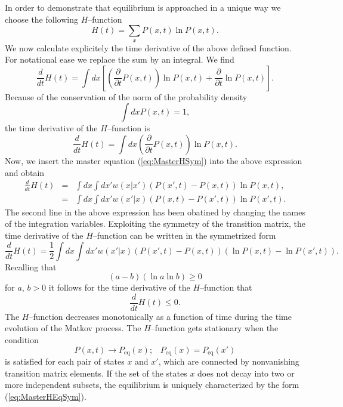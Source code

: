 In order to demonstrate that equilibrium is approached in a unique way we
choose the following $H$--function
\begin{displaymath}
  H(t) = \sum_x P(x,t) \ln P(x,t).
\end{displaymath}
We now calculate explicitely the time derivative of the above defined
function. For notational ease we replace the sum by an integral. We find
\begin{displaymath}
  \frac{d}{dt} H(t)  = \int dx 
\left[ \left( \frac{\partial}{\partial t} P(x,t) \right) \ln P(x,t) +
         \frac{\partial}{\partial t} \ln P(x,t) 
     \right].
\end{displaymath}
Because of the conservation of the norm of the probability density
\begin{displaymath}
  \int dx P(x,t) = 1,
\end{displaymath}
the time derivative of the $H$--function is
\begin{displaymath}
  \frac{d}{dt} H(t)  =  \int dx  
         \left( \frac{\partial}{\partial t} P(x,t) \right) \ln P(x,t).
\end{displaymath}
Now, we insert the master equation (\ref{eq:MasterHSym}) into the above
expression and obtain
\begin{eqnarray*}
 \frac{d}{dt} H(t) & = & \int dx \int dx' w(x|x') 
                            \left( P(x',t) - P(x,t) \right) 
                                \ln P(x,t), \\
                   & = & \int dx \int dx' w(x'|x) 
                            \left( P(x,t) - P(x',t) \right) 
                                \ln P(x',t).
\end{eqnarray*}
The second line in the above expression has been obatined by changing the
names of the integration variables. Exploiting the symmetry of the transition
matrix,  the time derivative of the $H$--function 
can be written in the symmetrized  form
\begin{displaymath}
  \frac{d}{dt} H(t) = \frac{1}{2}  \int dx \int dx' w(x'|x) 
             \left( P(x',t) - P(x,t) \right) 
             \left( \ln P(x,t) -  \ln P(x',t) \right).  
\end{displaymath}
Recalling that
\begin{displaymath}
  (a -b) (\ln a  \ln b) \ge 0 
\end{displaymath}
for $a$, $b >0$ it follows for the time derivative of the $H$--function that
\begin{displaymath}
   \frac{d}{dt} H(t) \le 0.
\end{displaymath}
The $H$--function decreases monotonically as a function of time during the
time evolution of the Matkov process. The $H$--function gets stationary when
the condition
\begin{displaymath}
  P(x,t) \rightarrow P_{\textrm{eq}} (x); \;\;\; 
           P_{\textrm{eq}}(x) =P_{\textrm{eq}}(x') 
\end{displaymath}
is satisfied for each pair of states $x$ and $x'$, which are connected by
nonvanishing transition matrix elements. If the set of the states $x$ does not
decay into two or more independent subsets, the equilibrium is uniquely
characterized by the form (\ref{eq:MasterHEqSym}).

